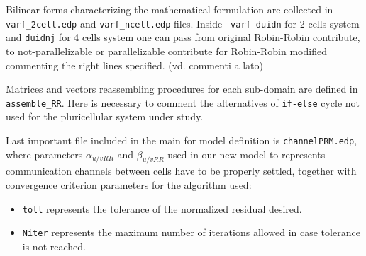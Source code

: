 Bilinear forms characterizing the mathematical formulation are collected in \verb|varf_2cell.edp| and \verb|varf_ncell.edp| files. Inside \verb| varf duidn| for 2 cells system and \verb|duidnj| for 4 cells system one can pass from original Robin-Robin contribute, to not-parallelizable or parallelizable contribute for Robin-Robin modified commenting the right lines specified. (vd. commenti a lato)

Matrices and vectors reassembling procedures for each sub-domain are defined in \verb|assemble_RR|. Here is necessary to comment the alternatives of \verb|if-else| cycle not used for the pluricellular system under study.

Last important file included in the main for model definition is \verb|channelPRM.edp|, where parameters $\alpha_{u/vRR}$ and $\beta_{u/vRR}$ used in our new model to represents communication channels between cells have to be properly settled, together with convergence criterion parameters for the algorithm used:
\begin{itemize}
  \item \verb|toll| represents the tolerance of the normalized residual desired.
  \item\verb|Niter| represents the maximum number of iterations allowed in case tolerance is not reached.
\end{itemize}
